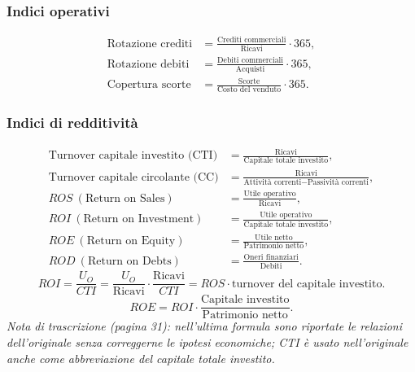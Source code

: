 \documentclass[11pt,a4paper]{article}
\newcommand{\orig}[1]{\clearpage}
\begin{document}
\subsubsection*{Indici operativi}
\begin{align*}
\text{Rotazione crediti}&=\frac{\text{Crediti commerciali}}{\text{Ricavi}}\cdot365,\\
\text{Rotazione debiti}&=\frac{\text{Debiti commerciali}}{\text{Acquisti}}\cdot365,\\
\text{Copertura scorte}&=\frac{\text{Scorte}}{\text{Costo del venduto}}\cdot365.
\end{align*}
\orig{31}\subsubsection*{Indici di redditività}
\begin{align*}
\text{Turnover capitale investito (CTI)}&=\frac{\text{Ricavi}}{\text{Capitale totale investito}},\\
\text{Turnover capitale circolante (CC)}&=\frac{\text{Ricavi}}{\text{Attività correnti}-\text{Passività correnti}},\\
ROS\ (\text{Return on Sales})&=\frac{\text{Utile operativo}}{\text{Ricavi}},\\
ROI\ (\text{Return on Investment})&=\frac{\text{Utile operativo}}{\text{Capitale totale investito}},\\
ROE\ (\text{Return on Equity})&=\frac{\text{Utile netto}}{\text{Patrimonio netto}},\\
ROD\ (\text{Return on Debts})&=\frac{\text{Oneri finanziari}}{\text{Debiti}}.
\end{align*}
\[ROI=\frac{U_O}{CTI}=\frac{U_O}{\text{Ricavi}}\cdot\frac{\text{Ricavi}}{CTI}
=ROS\cdot\text{turnover del capitale investito}.\]
\[ROE=ROI\cdot\frac{\text{Capitale investito}}{\text{Patrimonio netto}}.\]
\textit{Nota di trascrizione (pagina 31): nell'ultima formula sono riportate le relazioni dell'originale senza correggerne le ipotesi economiche; CTI è usato nell'originale anche come abbreviazione del capitale totale investito.}
\end{document}
